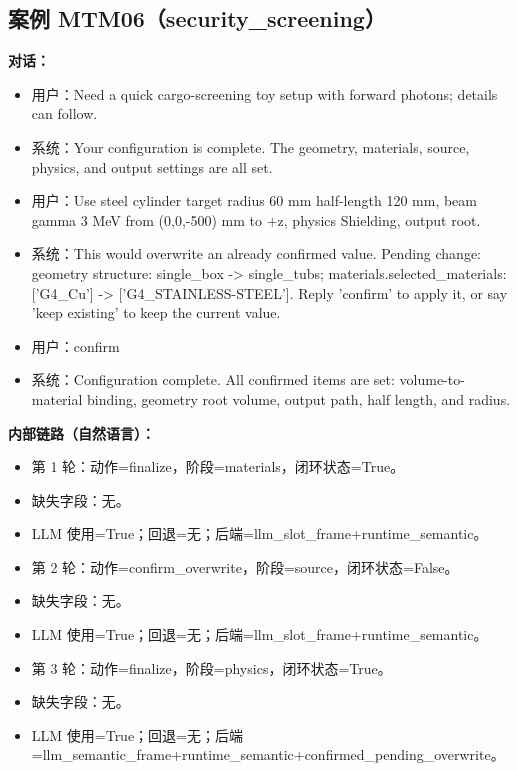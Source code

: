 \documentclass[11pt]{ctexart}
\begin{document}
\subsection{案例 MTM06（security\_screening）}
\textbf{对话：}
\begin{itemize}
\item 用户：Need a quick cargo-screening toy setup with forward photons; details can follow.
\item 系统：Your configuration is complete. The geometry, materials, source, physics, and output settings are all set.
\item 用户：Use steel cylinder target radius 60 mm half-length 120 mm, beam gamma 3 MeV from (0,0,-500) mm to +z, physics Shielding, output root.
\item 系统：This would overwrite an already confirmed value. Pending change: geometry structure: single\_box -> single\_tubs; materials.selected\_materials: ['G4\_Cu'] -> ['G4\_STAINLESS-STEEL']. Reply 'confirm' to apply it, or say 'keep existing' to keep the current value.
\item 用户：confirm
\item 系统：Configuration complete. All confirmed items are set: volume-to-material binding, geometry root volume, output path, half length, and radius.
\end{itemize}
\textbf{内部链路（自然语言）：}
\begin{itemize}
\item 第 1 轮：动作=finalize，阶段=materials，闭环状态=True。
\item 缺失字段：无。
\item LLM 使用=True；回退=无；后端=llm\_slot\_frame+runtime\_semantic。
\item 第 2 轮：动作=confirm\_overwrite，阶段=source，闭环状态=False。
\item 缺失字段：无。
\item LLM 使用=True；回退=无；后端=llm\_slot\_frame+runtime\_semantic。
\item 第 3 轮：动作=finalize，阶段=physics，闭环状态=True。
\item 缺失字段：无。
\item LLM 使用=True；回退=无；后端=llm\_semantic\_frame+runtime\_semantic+confirmed\_pending\_overwrite。
\end{itemize}
\end{document}
